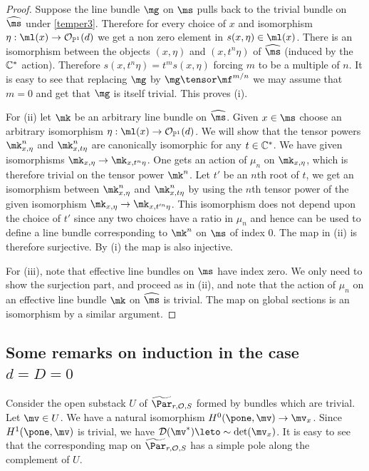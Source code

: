 \begin{proof}
Suppose the line bundle $\mg$ on ${\ms}$ pulls back  to the trivial bundle on $\widehat{\ms}$ under \eqref{temper3}. Therefore for every choice of $x$ and isomorphism $\eta:\ml(x)\to \mathcal{O}_{\Bbb{P}^1}(d)$
we get a non zero element in $s(x,\eta)\in\ml(x)$.
There is an isomorphism between the  objects $(x,\eta)$ and $(x,t^n\eta)$ of $\widehat{\ms}$ (induced by the $\Bbb{C}^*$ action). Therefore $s(x,t^n\eta)=t^m s(x,\eta)$ forcing $m$ to be a multiple of $n$. It is easy to see that replacing $\mg$ by $\mg\tensor\mf^{m/n}$ we  may assume that $m=0$ and get that $\mg$ is itself trivial. This proves (i).

For (ii) let $\mk$ be an arbitrary line bundle on $\widehat{\ms}$. Given $x\in\ms$ choose an arbitrary isomorphism $\eta:\ml(x)\to \mathcal{O}_{\Bbb{P}^1}(d)$. We will show that the tensor powers $\mk^n_{x,\eta}$ and $\mk^n_{x,t\eta}$ are canonically isomorphic for any $t\in \Bbb{C}^*$. We have given isomorphisms
$\mk_{x,\eta}\to \mk_{x,t^n\eta}$. One gets an action of $\mu_n$ on $\mk_{x,\eta}$, which is therefore
trivial on the tensor power $\mk^n$. Let $t'$ be an $n$th root of $t$, we get an isomorphism between $\mk^n_{x,\eta}$ and $\mk^n_{x,t\eta}$ by using the $n$th tensor power of the given isomorphism $\mk_{x,\eta}\to \mk_{x,t'^n\eta}$. This isomorphism does not depend upon the choice of $t'$  since any two choices have a ratio in $\mu_n$ and hence can be used to define a line bundle corresponding to $\mk^n$ on ${\ms}$ of index $0$. The map in (ii) is therefore surjective. By (i) the map is also injective.

For (iii), note that effective line bundles on ${\ms}$ have index zero. We only need to show the surjection part, and proceed as in (ii), and note that the action of $\mu_n$ on an effective line bundle $\mk$ on $\widehat{\ms}$ is trivial. The map on global sections is an isomorphism by a similar argument.
\end{proof}
\subsection{Some remarks on induction in the case $d=D=0$}
Consider the open substack $U$ of $\widetilde{\Par}_{r,\mathcal{O},S}$ formed by bundles which are trivial. Let $\mv\in U$. We have a natural
isomorphism $H^0(\pone,\mv)\to\mv_x$. Since $H^1(\pone,\mv)$ is trivial, we have $\mathcal{D}(\mv^*)\leto\sim \det(\mv_x)$. It is easy to see that the corresponding map on $\widetilde{\Par}_{r,\mathcal{O},S}$ has a simple pole along the complement of $U$.

